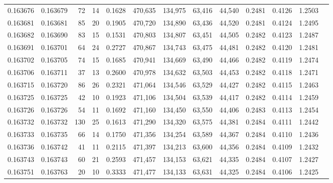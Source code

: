 \begin{tabular}{rrrrrrrrrrrrr}
0.163676 & 0.163679 &    72 &  14 &                                     0.1628 & 470,635 & 134,975 &  63,416 &  44,540 & 0.2481 & 0.4126 & 1.2503 \\
0.163681 & 0.163681 &    85 &  20 &                                     0.1905 & 470,720 & 134,890 &  63,436 &  44,520 & 0.2481 & 0.4124 & 1.2495 \\
0.163682 & 0.163690 &    83 &  15 &                                     0.1531 & 470,803 & 134,807 &  63,451 &  44,505 & 0.2482 & 0.4123 & 1.2487 \\
0.163691 & 0.163701 &    64 &  24 &                                     0.2727 & 470,867 & 134,743 &  63,475 &  44,481 & 0.2482 & 0.4120 & 1.2481 \\
0.163702 & 0.163705 &    74 &  15 &                                     0.1685 & 470,941 & 134,669 &  63,490 &  44,466 & 0.2482 & 0.4119 & 1.2474 \\
0.163706 & 0.163711 &    37 &  13 &                                     0.2600 & 470,978 & 134,632 &  63,503 &  44,453 & 0.2482 & 0.4118 & 1.2471 \\
0.163715 & 0.163720 &    86 &  26 &                                     0.2321 & 471,064 & 134,546 &  63,529 &  44,427 & 0.2482 & 0.4115 & 1.2463 \\
0.163725 & 0.163725 &    42 &  10 &                                     0.1923 & 471,106 & 134,504 &  63,539 &  44,417 & 0.2482 & 0.4114 & 1.2459 \\
0.163726 & 0.163726 &    54 &  11 &                                     0.1692 & 471,160 & 134,450 &  63,550 &  44,406 & 0.2483 & 0.4113 & 1.2454 \\
0.163732 & 0.163732 &   130 &  25 &                                     0.1613 & 471,290 & 134,320 &  63,575 &  44,381 & 0.2484 & 0.4111 & 1.2442 \\
0.163733 & 0.163735 &    66 &  14 &                                     0.1750 & 471,356 & 134,254 &  63,589 &  44,367 & 0.2484 & 0.4110 & 1.2436 \\
0.163736 & 0.163742 &    41 &  11 &                                     0.2115 & 471,397 & 134,213 &  63,600 &  44,356 & 0.2484 & 0.4109 & 1.2432 \\
0.163743 & 0.163743 &    60 &  21 &                                     0.2593 & 471,457 & 134,153 &  63,621 &  44,335 & 0.2484 & 0.4107 & 1.2427 \\
0.163751 & 0.163763 &    20 &  10 &                                     0.3333 & 471,477 & 134,133 &  63,631 &  44,325 & 0.2484 & 0.4106 & 1.2425 \\

\end{tabular}
